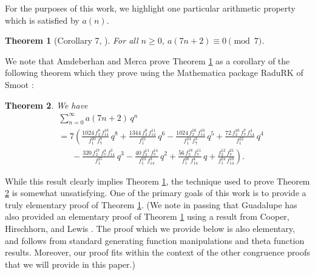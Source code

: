 \documentclass[10pt, reqno]{amsart}
\theoremstyle{theorem}
\newtheorem{theorem}{Theorem}[section]
\theoremstyle{definition}
\theoremstyle{example}
\begin{document}
For the purposes of this work, we highlight one particular arithmetic property which is satisfied by $a(n)$.  
\begin{theorem}[Corollary 7, \cite{AM}] 
\label{a_72mod7}
For all $n\geq 0$, $a(7n+2) \equiv 0 \pmod{7}$.  
\end{theorem}
We note that Amdeberhan and Merca prove Theorem \ref{a_72mod7} as a corollary of the following theorem which they prove using the Mathematica package RaduRK of Smoot \cite{Smoot}:  
\begin{theorem}
\label{a_7dissection}
We have 
\begin{align*}
        &\sum_{n=0}^\infty a(7n+2)\, q^n \\
        &= 7\left(\frac{1024\,f_2^8\,f_{14}^{18}}{f_1^{20}\,f_7^7}\,q^8 
        +\frac{1344\,f_2^9\,f_{14}^{11}}{f_1^{21}}\,q^6
        -\frac{1024\,f_2^{16}\,f_{14}^{10}}{f_1^{24}\, f_7^3}\,q^5 
        +\frac{72\,f_2^{10}\,f_7^7\,f_{14}^4}{f_1^{22}}\,q^4  \right. \\
         &      \left.   \ \ \ \ \ \ \ 
         -\frac{320\,f_2^{17}\,f_7^4\,f_{14}^3}{f_1^{25}}\,q^3 
        -\frac{40\,f_2^{11}\,f_7^{14}}{f_1^{23}\,f_{14}^3}\,q^2  
        +\frac{56\,f_2^{18}\, f_7^{11}}{f_1^{26}\, f_{14}^4}\,q
        +\frac{f_2^{12}\,f_7^{21}}{f_1^{24}\,f_{14}^{10}} \right).
\end{align*}
\end{theorem}
While this result clearly implies Theorem \ref{a_72mod7}, the technique used to prove Theorem \ref{a_7dissection} is somewhat unsatisfying.  One of the primary goals of this work is to provide a truly elementary proof of Theorem \ref{a_72mod7}.  
(We note in passing that Guadalupe \cite{Gua1} has also provided an elementary proof of Theorem \ref{a_72mod7} using a result from Cooper, Hirschhorn, and Lewis \cite{CHL}.  The proof which we provide below is also elementary, and follows from standard generating function manipulations and theta function results.  Moreover, our proof fits within the context of the other congruence proofs that we will provide in this paper.) 
\end{document}
